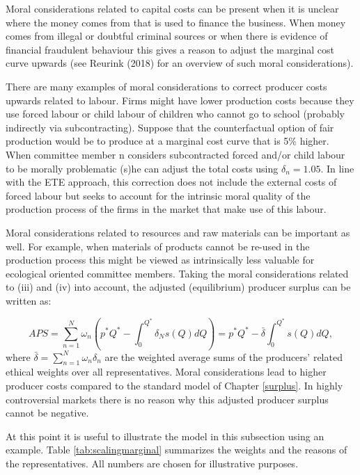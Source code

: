 \documentclass[
]{book}
\begin{document}
Moral considerations related to capital costs can be present when it is unclear where the money comes from that is used to finance the business. When money comes from illegal or doubtful criminal sources or when there is evidence of financial fraudulent behaviour this gives a reason to adjust the marginal cost curve upwards (see Reurink (2018) for an overview of such moral considerations).

There are many examples of moral considerations to correct producer costs upwards related to labour. Firms might have lower production costs because they use forced labour or child labour of children who cannot go to school (probably indirectly via subcontracting). Suppose that the counterfactual option of fair production would be to produce at a marginal cost curve that is 5\% higher. When committee member n considers subcontracted forced and/or child labour to be morally problematic (s)he can adjust the total costs using \(\delta_n=1.05\). In line with the ETE approach, this correction does not include the external costs of forced labour but seeks to account for the intrinsic moral quality of the production process of the firms in the market that make use of this labour.

Moral considerations related to resources and raw materials can be important as well. For example, when materials of products cannot be re-used in the production process this might be viewed as intrinsically less valuable for ecological oriented committee members. Taking the moral considerations related to (iii) and (iv) into account, the adjusted (equilibrium) producer surplus can be written as:

\begin{equation}
APS = \sum_{n=1}^N \omega_n \left(p^*Q^* - \int_0^{Q^*}\delta_N s(Q) dQ\right)= p^*Q^* - \bar{\delta} \int_0^{Q^*} s(Q) dQ,
\end{equation}
where \(\bar{\delta} = \sum^N_{n=1}\omega_n \delta_n\) are the weighted average sums of the producers' related ethical weights over all representatives. Moral considerations lead to higher producer costs compared to the standard model of Chapter \ref{surplus}. In highly controversial markets there is no reason why this adjusted producer surplus cannot be negative.

At this point it is useful to illustrate the model in this subsection using an example. Table \ref{tab:scalingmarginal} summarizes the weights and the reasons of the representatives. All numbers are chosen for illustrative purposes.
\end{document}
